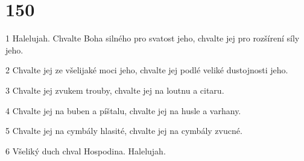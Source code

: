 \chapter{150}

\par 1 Halelujah. Chvalte Boha silného pro svatost jeho, chvalte jej pro rozšírení síly jeho.
\par 2 Chvalte jej ze všelijaké moci jeho, chvalte jej podlé veliké dustojnosti jeho.
\par 3 Chvalte jej zvukem trouby, chvalte jej na loutnu a citaru.
\par 4 Chvalte jej na buben a píštalu, chvalte jej na husle a varhany.
\par 5 Chvalte jej na cymbály hlasité, chvalte jej na cymbály zvucné.
\par 6 Všeliký duch chval Hospodina. Halelujah.

